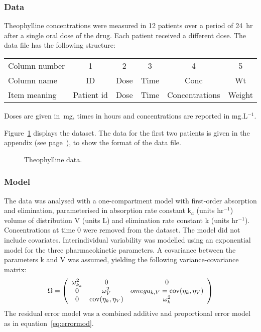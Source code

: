\subsubsection{Data}

\hskip 18pt Theophylline concentrations were measured in 12 patients over a period of 24~hr after a single oral dose of the drug. Each patient received a different dose. The data file has the following structure:
\begin{center}
\begin{tabular} {l c c c c c}
\hline
Column number & 1 & 2 & 3 & 4 & 5 \\
Column name & ID & Dose & Time & Conc & Wt \\
Item meaning & Patient id & Dose & Time & Concentrations & Weight \\
\hline
\end{tabular}
\end{center}
Doses are given in~mg, times in hours and concentrations are reported in mg.L$^{-1}$.

Figure~\ref{fig:theodata} displays the dataset. The data for the first two patients is given in the appendix (see page~\pageref{sec:appdata}), to show the format of the data file.
\begin{figure}[!h]
\par\kern -0.3cm
\begin{center}
\end{center}
\caption{Theophylline data.}\label{fig:theodata}
\end{figure}

\subsubsection{Model}

\hskip 18pt The data was analysed with a one-compartment model with first-order absorption and elimination, parameterised in absorption rate constant k$_a$ (units hr$^{-1}$) volume of distribution V (units L) and elimination rate constant k (units hr$^{-1}$). Concentrations at time 0 were removed from the dataset. The model did not include covariates. Interindividual variability was modelled using an exponential model for the three pharmacokinetic parameters. A covariance between the parameters k and V was assumed, yielding the following variance-covariance matrix:
\begin{equation}
\Omega=\left(
\begin{array}{ccc}
\omega_{k_a}^2 & 0 & 0\\
0 & \omega_{V}^2 & omega_{k,V}={\rm cov}(\eta_{k},\eta_{V}) \\
0 & {\rm cov}(\eta_{k},\eta_{V}) & \omega_{k}^2\\
\end{array}
\right)
\end{equation}
The residual error model was a combined additive and proportional
error model as in equation~\ref{eq:errormod}.

